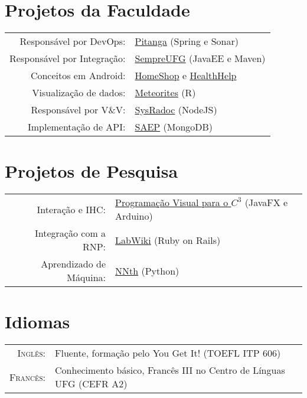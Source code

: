 \documentclass[a4paper,10pt]{article} %
\begin{document}
\section{Projetos da Faculdade}

\begin{tabular}{rl}
	Responsável por DevOps: &
	\href{https://github.com/SaladaDeFrutas/Pitanga}{Pitanga} (Spring e Sonar) \\
	Responsável por Integração: &
	\href{https://github.com/ES-INF-UFG-2016-2/Sempre-UFG}{SempreUFG} (JavaEE e Maven)\\
	Conceitos em Android: &
	\href{https://github.com/Yuri-M-Dias/HomeShop}{HomeShop} e
	\href{https://github.com/Yuri-M-Dias/HealthHelp}{HealthHelp} \\
	Visualização de dados: &
	\href{https://github.com/Yuri-M-Dias/meteorites}{Meteorites} (R) \\
	Responsável por V\&V: &
	\href{https://bitbucket.org/SysRadocTeam/sysradoc}{SysRadoc} (NodeJS) \\
	Implementação de API: &
	\href{https://github.com/Yuri-M-Dias/SAEP}{SAEP} (MongoDB) \\

\end{tabular}


\section{Projetos de Pesquisa}

\begin{tabular}{rl}

	Interação e IHC: &
	\href{https://siimi.medialab.ufg.br/up/777/o/49_cubos_interativos.pdf}{Programação Visual para o $C^3$} (JavaFX e Arduino)\\
	Integração com a RNP: &
	\href{https://github.com/Yuri-M-Dias/LabWiki}{LabWiki} (Ruby on Rails) \\
	Aprendizado de Máquina: &
	\href{https://gist.github.com/Yuri-M-Dias/d7b69fd8bc873cdf6029af5dcb5a8a0f}{NNth} (Python)\\

\end{tabular}


\section{Idiomas}

\begin{tabular}{rl}

	\textsc{Inglês:} & Fluente, formação pelo You Get It! (TOEFL ITP 606)\\

	\textsc{Francês:} & Conhecimento básico, Francês III no Centro de Línguas UFG (CEFR A2)\\

\end{tabular}
\end{document}
